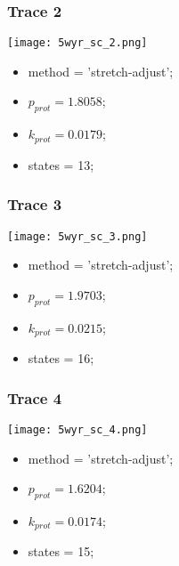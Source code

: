 \subsubsection{Trace 2}
\begin{minipage}[c]{0.7\textwidth}
    \texttt{[image: 5wyr\_sc\_2.png]}
\end{minipage}
\hfill
\begin{minipage}[c]{0.45\textwidth}
    \begin{itemize}
        \item method = 'stretch-adjust';
        \item $p_{prot}=1.8058$;
        \item $k_{prot}=0.0179$;
        \item states = 13;
    \end{itemize}
\end{minipage}

\subsubsection{Trace 3}
\begin{minipage}[c]{0.7\textwidth}
    \texttt{[image: 5wyr\_sc\_3.png]}
\end{minipage}
\hfill
\begin{minipage}[c]{0.45\textwidth}
    \begin{itemize}
        \item method = 'stretch-adjust';
        \item $p_{prot}=1.9703$;
        \item $k_{prot}=0.0215$;
        \item states = 16;
    \end{itemize}
\end{minipage}

\subsubsection{Trace 4}
\begin{minipage}[c]{0.7\textwidth}
    \texttt{[image: 5wyr\_sc\_4.png]}
\end{minipage}
\hfill
\begin{minipage}[c]{0.45\textwidth}
    \begin{itemize}
        \item method = 'stretch-adjust';
        \item $p_{prot}=1.6204$;
        \item $k_{prot}=0.0174$;
        \item states = 15;
    \end{itemize}
\end{minipage}

